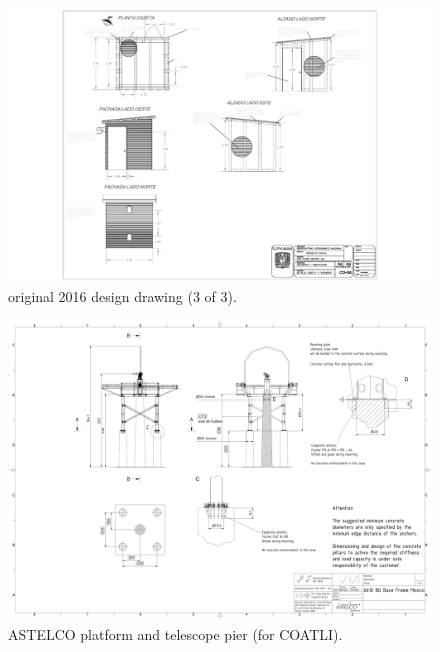 \begin{figure}
\begin{center}
\includegraphics[height=0.95\linewidth,angle=90]{figures/buildings-ddoti-drawing-2016-3.pdf}
\end{center}
\caption{{\projectname} original 2016 design drawing (3 of 3).}
\label{figure:buildings-drawing-2016-3}
\end{figure}

\begin{figure}
\begin{center}
\includegraphics[height=0.95\linewidth,angle=90]{figures/buildings-ddoti-astelco-enclosure-drawing-6610}
\end{center}
\caption{{\projectname} ASTELCO platform and telescope pier (for COATLI).}
\label{figure:buildings-drawing-astelco}
\end{figure}

